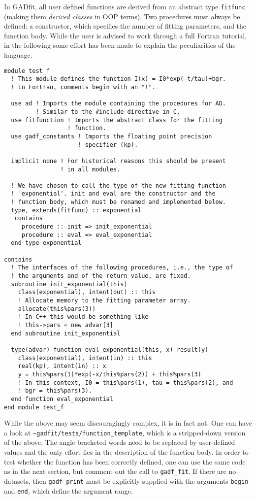 \documentclass{article}
\begin{document}
In GADfit, all user defined functions are derived from an abstract
type \texttt{fitfunc} (making them \textit{derived classes} in OOP
terms). Two procedures must always be defined: a constructor, which
specifies the number of fitting parameters, and the function
body. While the user is advised to work through a full Fortran
tutorial, in the following some effort has been made to explain the
peculiarities of the language.
\begin{verbatim}
module test_f
  ! This module defines the function I(x) = I0*exp(-t/tau)+bgr.
  ! In Fortran, comments begin with an "!".

  use ad ! Imports the module containing the procedures for AD. 
         ! Similar to the #include directive in C.
  use fitfunction ! Imports the abstract class for the fitting
                  ! function. 
  use gadf_constants ! Imports the floating point precision
                     ! specifier (kp).

  implicit none ! For historical reasons this should be present
                ! in all modules.

  ! We have chosen to call the type of the new fitting function
  ! 'exponential'. init and eval are the constructor and the
  ! function body, which must be renamed and implemented below.
  type, extends(fitfunc) :: exponential
   contains
     procedure :: init => init_exponential
     procedure :: eval => eval_exponential
  end type exponential

contains
  ! The interfaces of the following procedures, i.e., the type of
  ! the arguments and of the return value, are fixed.
  subroutine init_exponential(this)
    class(exponential), intent(out) :: this
    ! Allocate memory to the fitting parameter array.
    allocate(this%pars(3))
    ! In C++ this would be something like
    ! this->pars = new advar[3]
  end subroutine init_exponential

  type(advar) function eval_exponential(this, x) result(y)
    class(exponential), intent(in) :: this
    real(kp), intent(in) :: x
    y = this%pars(1)*exp(-x/this%pars(2)) + this%pars(3)
    ! In this context, I0 = this%pars(1), tau = this%pars(2), and
    ! bgr = this%pars(3).
  end function eval_exponential
end module test_f
\end{verbatim}
While the above may seem discouragingly complex, it is in fact
not. One can have a look at \verb+~gadfit/tests/function_template+,
which is a stripped-down version of the above. The angle-bracketed
words need to be replaced by user-defined values and the only effort
lies in the description of the function body. In order to test whether
the function has been correctly defined, one can use the same code as
in the next section, but comment out the call to \verb+gadf_fit+. If
there are no datasets, then \verb+gadf_print+ must be explicitly
supplied with the arguments \verb+begin+ and \verb+end+, which define
the argument range.
\end{document}
